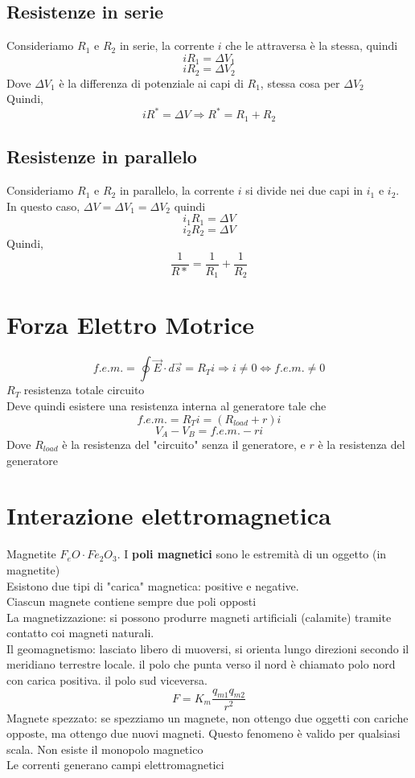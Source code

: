 \documentclass[a4paper]{report}
\begin{document}
  \subsection{Resistenze in serie}
  Consideriamo $R_1$ e $R_2$ in serie, la corrente $i$ che le attraversa è la stessa, quindi
  $$ i R_1 = \Delta V_1 $$
  $$ i R_2 = \Delta V_2 $$
  Dove $\Delta V_1$ è la differenza di potenziale ai capi di $R_1$, stessa cosa per $\Delta V_2$\\
  Quindi,
  $$ i R^* = \Delta V \Rightarrow R^* = R_1 +R_2 $$

  \subsection{Resistenze in parallelo}
  Consideriamo $R_1$ e $R_2$ in parallelo, la corrente $i$ si divide nei due capi in $i_1$ e $i_2$. In questo caso, $\Delta V = \Delta V_1 = \Delta V_2$ quindi
  $$ i_1 R_1 = \Delta V $$
  $$ i_2 R_2 = \Delta V $$
  Quindi,
  $$ \frac{1}{R*} = \frac{1}{R_1} + \frac{1}{R_2} $$

  \section{Forza Elettro Motrice}
  $$ f.e.m. = \oint \vec{E} \cdot d\vec{s} = R_T i \Rightarrow i \neq 0 \iff f.e.m. \neq 0$$
  $R_T$ resistenza totale circuito\\
  Deve quindi esistere una resistenza interna al generatore tale che
  $$ f.e.m. = R_T i = (R_{load} + r)i $$
  $$ V_A - V_B = f.e.m. -ri $$
  Dove $R_{load}$ è la resistenza del "circuito" senza il generatore, e $r$ è la resistenza del generatore

  \section{Interazione elettromagnetica}
  Magnetite $F_eO \cdot Fe_2O_3$. I \textbf{poli magnetici} sono le estremità di un oggetto (in magnetite)\\
  Esistono due tipi di "carica" magnetica: positive e negative.\\
  Ciascun magnete contiene sempre due poli opposti\\
  La magnetizzazione: si possono produrre magneti artificiali (calamite) tramite contatto coi magneti naturali.\\
  Il geomagnetismo: lasciato libero di muoversi, si orienta lungo direzioni secondo il meridiano terrestre locale. il polo che punta verso il nord è chiamato polo nord con carica positiva. il polo sud viceversa.\\
  $$F = K_m \frac{q_{m1}q_{m2}}{r^2}$$
  Magnete spezzato: se spezziamo un magnete, non ottengo due oggetti con cariche opposte, ma ottengo due nuovi magneti. Questo fenomeno è valido per qualsiasi scala. Non esiste il monopolo magnetico\\
  Le correnti generano campi elettromagnetici
\end{document}
